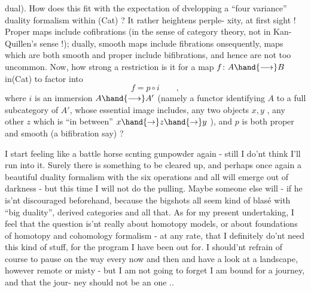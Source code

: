 
dual). How does this fit with the expectation of dvelopping a ``four
variance'' duality formalism within (Cat) ? It rather heightens perple-%
xity, at first sight ! Proper maps include cofibrations (in the sense
of category theory, not in  Kan-Quillen's sense !); dually, smooth
maps include fibrations\deleted{;} onsequently, maps which are both smooth and
proper include bifibrations, and hence are not too uncommon. Now, how
strong a restriction is it for a map $f\colon A\hand{\longrightarrow} B$ in(\hand{(}Cat) to factor into
\[ f = p\circ i \qquad , \]
where $i$ is an immersion $A\hand{\longrightarrow} A'$ (namely a functor identifying $A$ to
a full subcategory of $A'$, whose essential image includes,   any
two objects $x,y$ , any other $z$ which is ``in between'' $x\hand{\to} z\hand{\to} y$ ),
and $p$ is both proper and smooth (a bifibration say) ?

I  start feeling like a  battle horse scnting
gunpowder again - still I do'nt think I'll run into it. Surely there
is something to be cleared up, and perhaps once again a beautiful
duality formalism with the six operations and all will emerge out of
darkness - but this time I will not do the pulling. Maybe someone
else will - if he is'nt discouraged beforehand, because the bigshots
all seem kind of blasé with  ``big duality'', derived categories
and all that. As for my present undertaking, I feel that the question
is'nt really  about homotopy models, or about foundations
of homotopy and cohomology formalism - at any rate, that I definitely
do'nt need this kind of stuff, for the program I have been out for.
I should'nt refrain of course to pause on the way every now and then
and have a look at a landscape, however remote  or misty - but
I am not going to forget I am bound for a journey, and that the jour-%
ney should not be an   one \xout{!}..

